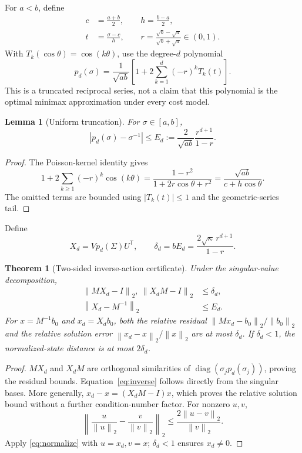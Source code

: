 \documentclass[10pt]{article}
\newtheorem{theorem}{Theorem}
\newtheorem{lemma}{Lemma}
\newcommand{\norm}[1]{\left\lVert #1\right\rVert}
\newcommand{\tr}{\mathsf T}
\begin{document}
For $a<b$, define
\begin{equation}\label{eq:param}
 \begin{aligned}
 c&=\frac{a+b}{2},\qquad h=\frac{b-a}{2},\\
 t&=\frac{\sigma-c}{h},\qquad
 r=\frac{\sqrt b-\sqrt a}{\sqrt b+\sqrt a}\in(0,1).
 \end{aligned}
\end{equation}
With $T_k(\cos\theta)=\cos(k\theta)$, use the degree-$d$ polynomial
\begin{equation}\label{eq:poly}
 p_d(\sigma)=\frac{1}{\sqrt{ab}}\left[1+2\sum_{k=1}^{d}(-r)^kT_k(t)\right].
\end{equation}
This is a truncated reciprocal series, not a claim that this polynomial is the optimal minimax approximation under every cost model.

\begin{lemma}[Uniform truncation]\label{lem:tail}
For $\sigma\in[a,b]$,
\begin{equation}\label{eq:tail}
 |p_d(\sigma)-\sigma^{-1}|\le E_d
 :=\frac{2}{\sqrt{ab}}\frac{r^{d+1}}{1-r}.
\end{equation}
\end{lemma}
\begin{proof}
The Poisson-kernel identity gives
\[
 1+2\sum_{k\ge1}(-r)^k\cos(k\theta)
 =\frac{1-r^2}{1+2r\cos\theta+r^2}
 =\frac{\sqrt{ab}}{c+h\cos\theta}.
\]
The omitted terms are bounded using $|T_k(t)|\le1$ and the geometric-series tail.
\end{proof}
Define
\begin{equation}\label{eq:delta}
 X_d=Vp_d(\Sigma)U^{\tr},\qquad
 \delta_d=bE_d=\frac{2\sqrt\kappa\,r^{d+1}}{1-r}.
\end{equation}

\begin{theorem}[Two-sided inverse-action certificate]\label{thm:op}
Under the singular-value decomposition,
\begin{align}
 \norm{MX_d-I}_2,\ \norm{X_dM-I}_2&\le\delta_d,\label{eq:residual}\\
 \norm{X_d-M^{-1}}_2&\le E_d.\label{eq:inverse}
\end{align}
For $x=M^{-1}b_0$ and $x_d=X_db_0$, both the relative residual $\norm{Mx_d-b_0}_2/\norm{b_0}_2$ and the relative solution error $\norm{x_d-x}_2/\norm{x}_2$ are at most $\delta_d$. If $\delta_d<1$, the normalized-state distance is at most $2\delta_d$.
\end{theorem}
\begin{proof}
$MX_d$ and $X_dM$ are orthogonal similarities of $\operatorname{diag}(\sigma_jp_d(\sigma_j))$, proving the residual bounds. Equation~\eqref{eq:inverse} follows directly from the singular bases. More generally,
$x_d-x=(X_dM-I)x$, which proves the relative solution bound without a further condition-number factor. For nonzero $u,v$,
\begin{equation}\label{eq:normalize}
 \norm{\frac{u}{\norm u_2}-\frac{v}{\norm v_2}}_2
 \le\frac{2\norm{u-v}_2}{\norm v_2}.
\end{equation}
Apply \eqref{eq:normalize} with $u=x_d,v=x$; $\delta_d<1$ ensures $x_d\ne0$.
\end{proof}
\end{document}
